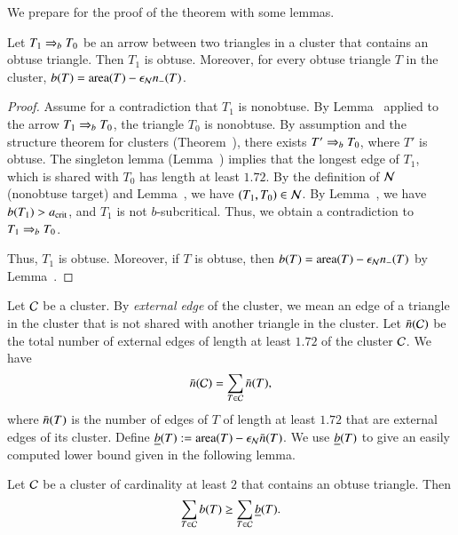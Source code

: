 We prepare for the proof of the theorem with some lemmas.

\begin{lemma}  
  Let $T_1\Rightarrow_{b} T_0$ be an
  arrow between two triangles in a cluster that contains an obtuse
  triangle.  Then $T_1$ is obtuse.  Moreover, for every obtuse
  triangle $T$ in the cluster, $b(T) = {\operatorname{area}}(T) -\epsilon_{\mathcal N} n_-(T)$.
\end{lemma}

\begin{proof} 
  Assume for a contradiction that $T_1$ is nonobtuse.  By
  Lemma~ applied to the arrow $T_1\Rightarrow_{b} T_0$, the
  triangle $T_0$ is nonobtuse.  By assumption and the structure
  theorem for clusters (Theorem~), there exists $T'\Rightarrow_{b} T_0$, where $T'$ is
  obtuse.  The singleton lemma (Lemma~) implies
  that the longest edge of $T_1$, which is shared with $T_0$ has
  length at least $1.72$.  By the definition of $\mathcal N$ (nonobtuse
  target) and Lemma~, we have $(T_1,T_0)\in\mathcal N$.  By Lemma~, we have
  $b(T_1)>a_\text{crit}$, and $T_1$ is not $b$-subcritical.  Thus, we obtain
  a contradiction to $T_1\Rightarrow_{b} T_0$.

 Thus, $T_1$ is obtuse.
  Moreover, if $T$ is obtuse, then $b(T) = {\operatorname{area}}(T) -\epsilon_{\mathcal N} n_-(T)$ by
  Lemma~.
\end{proof}

Let $\mathcal C$ be a cluster.  By {\it external edge} of the cluster, we mean an
edge of a triangle in the cluster that is not shared with another
triangle in the cluster.  Let $\bar n(\mathcal C)$ be the total number of
external edges of length at least $1.72$ of the cluster $\mathcal C$.  We have
\[
\bar n(\mathcal C) =\sum_{T\in \mathcal C} \bar n(T),
\]
where $\bar n(T)$ is the number of edges of $T$ of length at least $1.72$
that are external edges of its cluster.
Define $\underline{b}(T) := {\operatorname{area}}(T)-\epsilon_{\mathcal N}\bar n(T)$.  We use $\underline{b}(T)$ to give an
easily computed lower bound given in the following lemma.

\begin{lemma} 
  Let $\mathcal C$ be a cluster of cardinality at least $2$ 
  that contains an obtuse triangle.
Then 
\[
\sum_{T\in\mathcal C} b(T)\ge \sum_{T\in\mathcal C} \underline{b}(T).
\]
\end{lemma}

